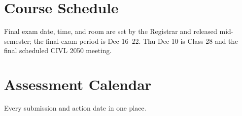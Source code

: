 \section*{Course Schedule}
{\footnotesize}

\vspace{-0.2em}
{\footnotesize Final exam date, time, and room are set by the Registrar and released mid-semester; the final-exam period is Dec 16--22. Thu Dec 10 is Class 28 and the final scheduled CIVL 2050 meeting.}

\clearpage
\section*{Assessment Calendar}
Every submission and action date in one place.

{\scriptsize}
